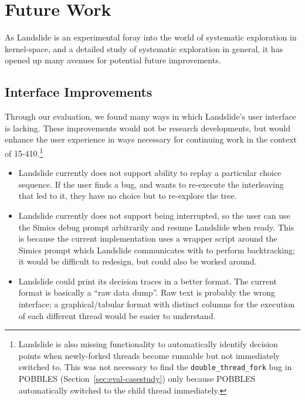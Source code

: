 \section{Future Work}
\label{sec:future}

As Landslide is an experimental foray into the world of systematic exploration in kernel-space, and a detailed study of systematic exploration in general, it has opened up many avenues for potential future improvements.

\subsection{Interface Improvements}
\label{sec:future-interface}

Through our evaluation, we found many ways in which Landslide's user interface is lacking. These improvements would not be research developments, but would enhance the user experience in ways necessary for continuing work in the context of 15-410.\footnote{
Landslide is also missing functionality to automatically identify decision points when newly-forked threads become runnable but not immediately switched to. This was not necessary to find the \texttt{double\_thread\_fork} bug in POBBLES (Section~\ref{sec:eval-casestudy}) only because POBBLES automatically switched to the child thread immediately.}

\begin{itemize}
	\item Landslide currently does not support ability to replay a particular choice sequence. If the user finds a bug, and wants to re-execute the interleaving that led to it, they have no choice but to re-explore the tree.
	\item Landslide currently does not support being interrupted, so the user can use the Simics debug prompt arbitrarily and resume Landslide when ready. This is because the current implementation uses a wrapper script around the Simics prompt which Landslide communicates with to perform backtracking; it would be difficult to redesign, but could also be worked around.
	\item Landslide could print its decision traces in a better format. The current format is basically a ``raw data dump''. Raw text is probably the wrong interface; a graphical/tabular format with distinct columns for the execution of each different thread would be easier to understand.
\end{itemize}

